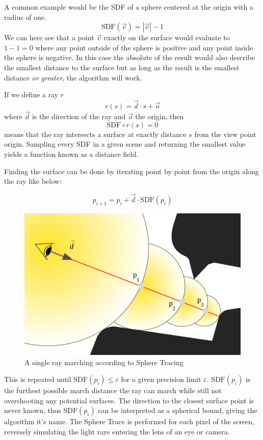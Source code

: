 		A common example would be the SDF of a sphere centered at the origin
		with a radius of one. $$\text{SDF}(\vec{v}) = |\vec{v}| - 1$$ We can
		here see that a point $\vec{v}$ exactly on the surface would evaluate
		to $1 - 1 = 0$ where any point outside of the sphere is positive and
		any point inside the sphere is negative. In this case the absolute of
		the result would also describe the smallest distance to the surface but
		as long as the result is the smallest distance \emph{or greater}, the
		algorithm will work.

		If we define a ray $r$ $$r(s) = \vec{d} \cdot s + \vec{o}$$ where
		$\vec{d}$ is the direction of the ray and $\vec{o}$ the origin, then
		$$\text{SDF}\circ r(s) = 0$$ means that the ray intersects a surface at
		exactly distance $s$ from the view point origin. Sampling every SDF in
		a given scene and returning the smallest value yields a function known
		as a distance field.

		\bigskip \noindent Finding the surface can be done by iterating point by
		point from the origin along the ray like below: 
		
		$$p_{i+1} = p_i + \vec{d}\cdot \text{SDF}(p_i)$$ 
		
		\begin{figure}
			\centering
			\includegraphics[width=0.75\linewidth]{figure/SDF2}
			\caption{A single ray marching according to Sphere Tracing}
		\end{figure}

		This is repeated until $\text{SDF}(p_i) \leq \varepsilon$ for a given
		precision limit $\varepsilon$. $\text{SDF}(p_i)$ is the furthest
		possible march distance the ray can march while still not overshooting
		any potential surfaces. The direction to the closest surface point is
		never known, thus $\text{SDF}(p_i)$ can be interpreted as a spherical
		bound, giving the algorithm it's name. The Sphere Trace is performed
		for each pixel of the screen, reversely simulating the light rays
		entering the lens of an eye or camera.
		

